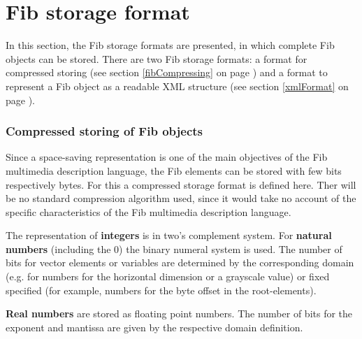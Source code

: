 %
%
%
%
%


\newpage
\part{Fib storage format}
\label{partFileFormat}

In this section, the Fib storage formats are presented, in which complete Fib objects can be stored. There are two Fib storage formats: a format for compressed storing (see section \ref{fibCompressing} on page \pageref{fibCompressing}) and a format to represent a Fib object as a readable XML structure (see section \ref{xmlFormat} on page \pageref{xmlFormat}).


\section{Compressed storing of Fib objects}
\label{fibCompressing}

Since a space-saving representation is one of the main objectives of the Fib multi\-media description language, the Fib elements can be stored with few bits respectively bytes. For this a compressed storage format is defined here. Ther will be no standard compression algorithm used, since it would take no account of the specific characteristics of the Fib multimedia description language.



The representation of \textbf{integers} is in two's complement system. For \textbf{natural numbers} (including the $0$) the binary numeral system is used. The number of bits for vector elements or variables are determined by the corresponding domain (e.g. for numbers for the horizontal dimension or a grayscale value) or fixed specified (for example, numbers for the byte offset in the root-elements).

\textbf{Real numbers} are stored as floating point numbers. The number of bits for the exponent and mantissa are given by the respective domain definition.


